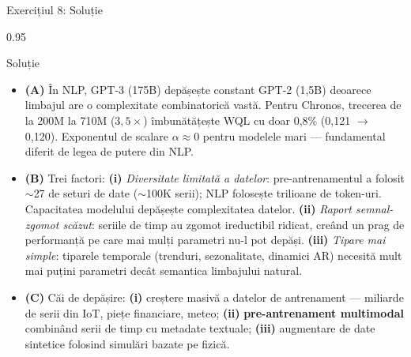\documentclass[9pt, aspectratio=169, t]{beamer}
\begin{document}
\begin{frame}{Exercițiul 8: Soluție}
    \begin{cminipage}{0.95\textwidth}
    \begin{exampleblock}{Soluție}
        {\footnotesize
        \begin{itemize}\setlength{\itemsep}{1pt}
            \item \textcolor{MainBlue}{\textbf{(A)}} În NLP, GPT-3 (175B) depășește constant GPT-2 (1,5B) deoarece limbajul are o complexitate combinatorică vastă. Pentru Chronos, trecerea de la 200M la 710M ($3{,}5\times$) îmbunătățește WQL cu doar 0,8\% (0,121 $\to$ 0,120). Exponentul de scalare $\alpha \approx 0$ pentru modelele mari --- fundamental diferit de legea de putere din NLP.
            \item \textcolor{MainBlue}{\textbf{(B)}} Trei factori: \textbf{(i)} \textit{Diversitate limitată a datelor}: pre-antrenamentul a folosit $\sim$27 de seturi de date ($\sim$100K serii); NLP folosește trilioane de token-uri. Capacitatea modelului depășește complexitatea datelor. \textbf{(ii)} \textit{Raport semnal-zgomot scăzut}: seriile de timp au zgomot ireductibil ridicat, creând un prag de performanță pe care mai mulți parametri nu-l pot depăși. \textbf{(iii)} \textit{Tipare mai simple}: tiparele temporale (trenduri, sezonalitate, dinamici AR) necesită mult mai puțini parametri decât semantica limbajului natural.
            \item \textcolor{MainBlue}{\textbf{(C)}} Căi de depășire: \textbf{(i)} creștere masivă a datelor de antrenament --- miliarde de serii din IoT, piețe financiare, meteo; \textbf{(ii)} \textbf{pre-antrenament multimodal} combinând serii de timp cu metadate textuale; \textbf{(iii)} augmentare de date sintetice folosind simulări bazate pe fizică.
        \end{itemize}
        }
    \end{exampleblock}
    \end{cminipage}
\end{frame}
\end{document}

